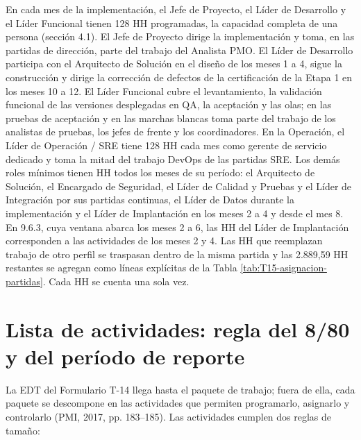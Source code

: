 En cada mes de la implementación, el Jefe de Proyecto, el Líder de Desarrollo y el Líder Funcional tienen 128 HH programadas, la capacidad completa de una persona (sección 4.1). El Jefe de Proyecto dirige la implementación y toma, en las partidas de dirección, parte del trabajo del Analista PMO. El Líder de Desarrollo participa con el Arquitecto de Solución en el diseño de los meses 1 a 4, sigue la construcción y dirige la corrección de defectos de la certificación de la Etapa 1 en los meses 10 a 12. El Líder Funcional cubre el levantamiento, la validación funcional de las versiones desplegadas en QA, la aceptación y las olas; en las pruebas de aceptación y en las marchas blancas toma parte del trabajo de los analistas de pruebas, los jefes de frente y los coordinadores. En la Operación, el Líder de Operación / SRE tiene 128 HH cada mes como gerente de servicio dedicado y toma la mitad del trabajo DevOps de las partidas SRE. Los demás roles mínimos tienen HH todos los meses de su período: el Arquitecto de Solución, el Encargado de Seguridad, el Líder de Calidad y Pruebas y el Líder de Integración por sus partidas continuas, el Líder de Datos durante la implementación y el Líder de Implantación en los meses 2 a 4 y desde el mes 8. En 9.6.3, cuya ventana abarca los meses 2 a 6, las HH del Líder de Implantación corresponden a las actividades de los meses 2 y 4. Las HH que reemplazan trabajo de otro perfil se traspasan dentro de la misma partida y las 2.889,59 HH restantes se agregan como líneas explícitas de la Tabla \ref{tab:T15-asignacion-partidas}. Cada HH se cuenta una sola vez.

\section{Lista de actividades: regla del 8/\allowbreak{}80 y del período de reporte}

La EDT del Formulario T-14 llega hasta el paquete de trabajo; fuera de ella, cada paquete se descompone en las actividades que permiten programarlo, asignarlo y controlarlo (PMI, 2017, pp. 183–185). Las actividades cumplen dos reglas de tamaño:


